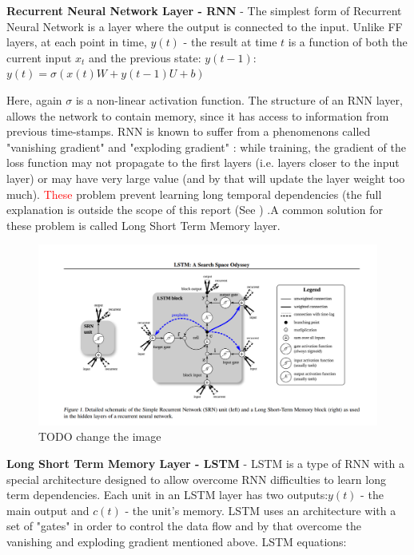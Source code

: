 \documentclass[
12pt, %
english, %
doublespacing, %
headsepline, %
]{MastersDoctoralThesis} %
\begin{document}

\textbf{Recurrent Neural Network Layer - RNN} - The simplest form of Recurrent Neural Network \cite{rumelhart1985learning, werbos1988generalization} is a layer where the output is connected to the input. Unlike FF layers, at each point in time, $y(t)$ - the result at time $t$ is a function of both the current input $x_t$ and the previous state: 
$y(t-1)$:  
	$y\left( t \right) = \sigma \left( {x\left( t \right)W + y\left( {t - 1} \right)U + b} \right)$


Here, again $\sigma $ is a non-linear activation function. The structure of an RNN layer, allows the network to contain memory, since it has access to information from previous time-stamps. RNN is known to suffer from a  phenomenons called "vanishing gradient" and "exploding gradient" \cite{pascanu2013difficulty}: while training, the gradient of the loss function may not propagate to the first layers (i.e. layers closer to the input layer) or may have very large value (and by that will update the layer weight too much). \textcolor{red}{These} problem prevent learning long temporal dependencies (the full explanation is outside the scope of this report (See \cite{bengio1994learning}) .A common solution for these problem is called Long Short Term Memory layer.

\begin{figure}
\centering
\includegraphics[width=0.7\linewidth]{LSTM_RNN_placeholder.png}
\caption{TODO change the image}


\label{fig:RNN-rolled}
\end{figure}


\textbf{Long Short Term Memory Layer - LSTM} - LSTM is a type of RNN with a special architecture designed to allow overcome RNN difficulties to learn long term dependencies. Each unit in an LSTM layer has two outputs:$y(t)$ - the main output and $c(t)$ - the unit's memory. LSTM uses an architecture with a set of "gates" in order to control the data flow and by that overcome the vanishing and exploding gradient mentioned above. LSTM equations:
\end{document}
